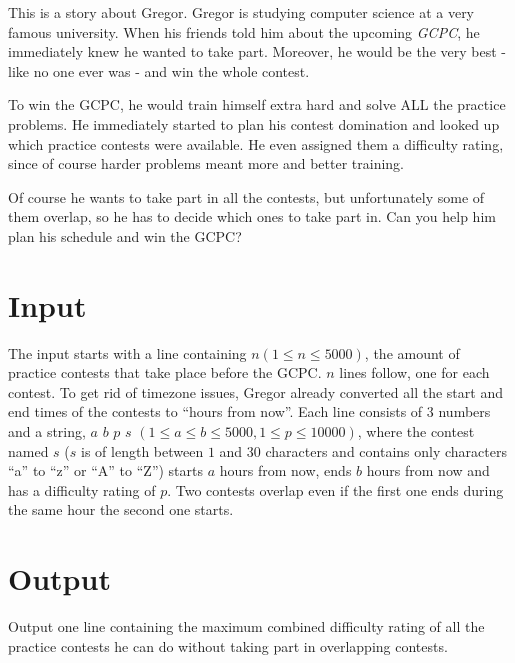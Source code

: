 
This is a story about Gregor.
Gregor is studying computer science at a very famous university.
When his friends told him about the upcoming \emph{GCPC}, he immediately knew he wanted to take part.
Moreover, he would be the very best - like no one ever was - and win the whole contest.

To win the GCPC, he would train himself extra hard and solve ALL the practice problems.
He immediately started to plan his contest domination and looked up which practice contests were available.
He even assigned them a difficulty rating, since of course harder problems meant more and better training. 

Of course he wants to take part in all the contests, but unfortunately some of them overlap, so he has to decide which ones to take part in.
Can you help him plan his schedule and win the GCPC?

\section*{Input}
The input starts with a line containing $n (1 \leq n \leq 5000)$, the amount of practice contests that take place before the GCPC.
$n$ lines follow, one for each contest. 
To get rid of timezone issues, Gregor already converted all the start and end times of the contests to ``hours from now''.
Each line consists of $3$ numbers and a string, $a$ $b$ $p$ $s$ $(1 \leq a \leq b \leq 5000, 1 \leq p \leq 10000)$, where the contest named $s$ ($s$ is of length between $1$ and $30$ characters and contains only characters ``a'' to ``z'' or ``A'' to ``Z'') starts $a$ hours from now, ends $b$ hours from now and has a difficulty rating of $p$.
Two contests overlap even if the first one ends during the same hour the second one starts.

\section*{Output}
Output one line containing the maximum combined difficulty rating of all the practice contests he can do without taking part in overlapping contests.
